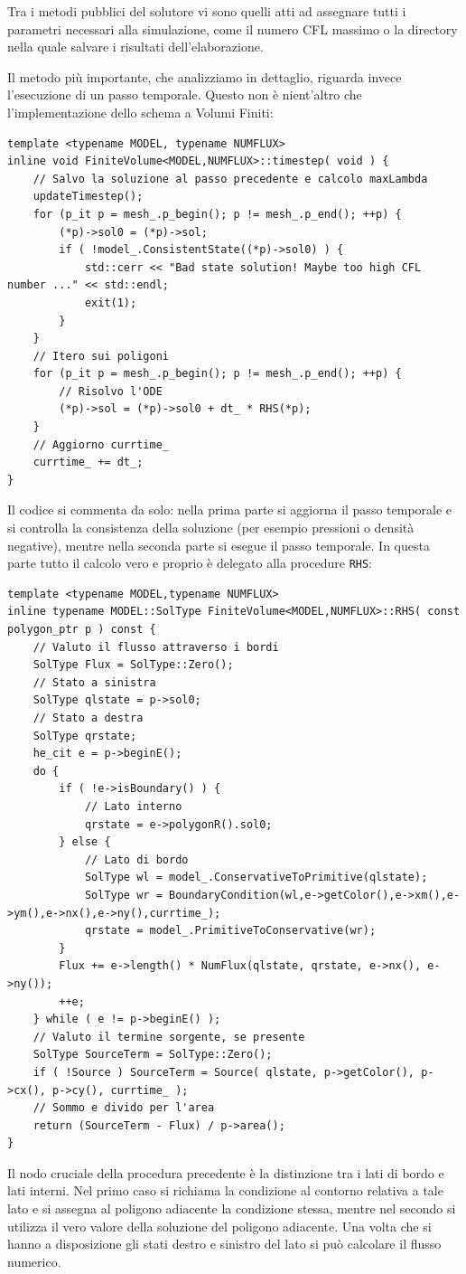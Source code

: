 Tra i metodi pubblici del solutore vi sono quelli atti ad assegnare tutti i parametri necessari alla simulazione, come il numero CFL massimo o la directory nella quale salvare i risultati dell'elaborazione.

Il metodo più importante, che analizziamo in dettaglio, riguarda invece l'esecuzione di un passo temporale. Questo non è nient'altro che l'implementazione dello schema a Volumi Finiti:
\begin{lstlisting}
template <typename MODEL, typename NUMFLUX>
inline void FiniteVolume<MODEL,NUMFLUX>::timestep( void ) {
	// Salvo la soluzione al passo precedente e calcolo maxLambda
	updateTimestep();
	for (p_it p = mesh_.p_begin(); p != mesh_.p_end(); ++p) {
		(*p)->sol0 = (*p)->sol;
		if ( !model_.ConsistentState((*p)->sol0) ) {
			std::cerr << "Bad state solution! Maybe too high CFL number ..." << std::endl;
			exit(1);
		}
	}
	// Itero sui poligoni
	for (p_it p = mesh_.p_begin(); p != mesh_.p_end(); ++p) {
		// Risolvo l'ODE
		(*p)->sol = (*p)->sol0 + dt_ * RHS(*p);
	}
	// Aggiorno currtime_
	currtime_ += dt_;
}		
\end{lstlisting}
Il codice si commenta da solo: nella prima parte si aggiorna il passo temporale e si controlla la consistenza della soluzione (per esempio pressioni o densità negative), mentre nella seconda parte si esegue il passo temporale. In questa parte tutto il calcolo vero e proprio è delegato alla procedure \texttt{RHS}:
\begin{lstlisting}
template <typename MODEL,typename NUMFLUX>
inline typename MODEL::SolType FiniteVolume<MODEL,NUMFLUX>::RHS( const polygon_ptr p ) const {
	// Valuto il flusso attraverso i bordi
	SolType Flux = SolType::Zero();
	// Stato a sinistra
	SolType qlstate = p->sol0;
	// Stato a destra
	SolType qrstate;
	he_cit e = p->beginE();
	do {
		if ( !e->isBoundary() ) {
			// Lato interno
			qrstate = e->polygonR().sol0;
		} else {
			// Lato di bordo
			SolType wl = model_.ConservativeToPrimitive(qlstate);
			SolType wr = BoundaryCondition(wl,e->getColor(),e->xm(),e->ym(),e->nx(),e->ny(),currtime_);
			qrstate = model_.PrimitiveToConservative(wr);
		}
		Flux += e->length() * NumFlux(qlstate, qrstate, e->nx(), e->ny());
		++e;
	} while ( e != p->beginE() );
	// Valuto il termine sorgente, se presente
	SolType SourceTerm = SolType::Zero();
	if ( !Source ) SourceTerm = Source( qlstate, p->getColor(), p->cx(), p->cy(), currtime_ );
	// Sommo e divido per l'area
	return (SourceTerm - Flux) / p->area();
}
\end{lstlisting}
Il nodo cruciale della procedura precedente è la distinzione tra i lati di bordo e lati interni. Nel primo caso si richiama la condizione al contorno relativa a tale lato e si assegna al poligono adiacente la condizione stessa, mentre nel secondo si utilizza il vero valore della soluzione del poligono adiacente. Una volta che si hanno a disposizione gli stati destro e sinistro del lato si può calcolare il flusso numerico.


